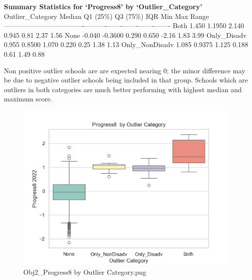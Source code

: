 \documentclass[
  letterpaper,
  DIV=11,
  numbers=noendperiod]{scrartcl}
\begin{document}
\textbf{Summary Statistics for `Progress8' by `Outlier\_Category'}
\textbar{} Outlier\_Category \textbar{} Median \textbar{} Q1 (25\%)
\textbar{} Q3 (75\%) \textbar{} IQR \textbar{} Min \textbar{} Max
\textbar{} Range \textbar{}
\textbar------------------\textbar--------\textbar----------\textbar----------\textbar-------\textbar-------\textbar-------\textbar-------\textbar{}
\textbar{} Both \textbar{} 1.450 \textbar{} 1.1950 \textbar{} 2.140
\textbar{} 0.945 \textbar{} 0.81 \textbar{} 2.37 \textbar{} 1.56
\textbar{} \textbar{} None \textbar{} -0.040 \textbar{} -0.3600
\textbar{} 0.290 \textbar{} 0.650 \textbar{} -2.16 \textbar{} 1.83
\textbar{} 3.99 \textbar{} \textbar{} Only\_Disadv \textbar{} 0.955
\textbar{} 0.8500 \textbar{} 1.070 \textbar{} 0.220 \textbar{} 0.25
\textbar{} 1.38 \textbar{} 1.13 \textbar{} \textbar{} Only\_NonDisadv
\textbar{} 1.085 \textbar{} 0.9375 \textbar{} 1.125 \textbar{} 0.188
\textbar{} 0.61 \textbar{} 1.49 \textbar{} 0.88 \textbar{}

Non positive outlier schools are are expected nearing 0; the minor
difference may be due to negative outlier schools being included in that
group. Schools which are outliers in both categories are much better
performing with highest median and maximum score.

\begin{figure}[H]

{\centering \includegraphics{images/Obj2_Progress8 by Outlier Category.png}

}

\caption{Obj2\_Progress8 by Outlier Category.png}

\end{figure}%
\end{document}

